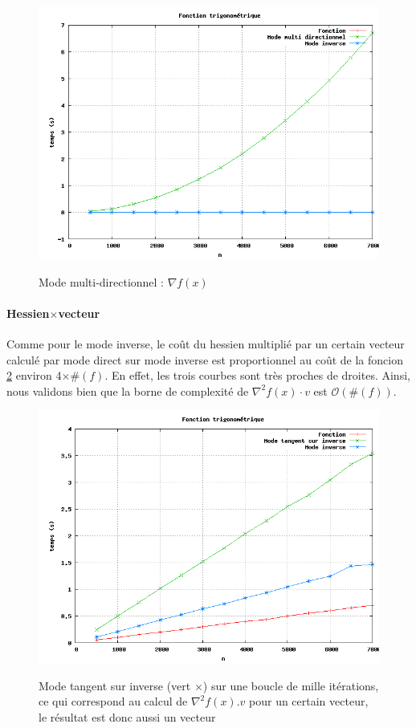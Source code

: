 \begin{figure}
\caption{Mode multi-directionnel : $\nabla f(x)$}
\center
\includegraphics[scale=0.4]{figures/temps4.png}
\label{fig:temps4}
\end{figure}


\paragraph{Hessien$\times$vecteur}

Comme pour le mode inverse, le coût du hessien multipli\'e par un certain vecteur calcul\'e par mode direct sur mode inverse est proportionnel
 au coût de la foncion \ref{fig:temps3} environ 4$\times\#(f)$. {\co En effet, les trois courbes sont tr\`es proches de droites. Ainsi, nous validons
bien que la borne de complexit\'e de $\nabla^2f(x)\cdot v$ est $\mathcal{O}(\#(f))$.}


\begin{figure}
\caption{Mode tangent sur inverse (vert $\times$) sur une boucle de mille it\'erations, ce qui correspond au calcul de $\nabla^2 f(x).v$ pour un certain vecteur, le r\'esultat
est donc aussi un vecteur}
\center
\includegraphics[scale=0.4]{figures/temps3.png}
\label{fig:temps3}
\end{figure}






